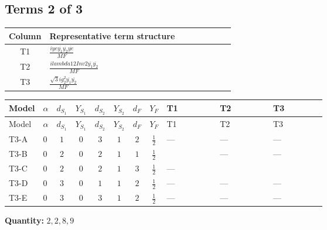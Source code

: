 \documentclass[8pt]{article}
\begin{document}
\begin{landscape}
\subsection*{Terms 2 of 3}
\begin{center}
\begin{tabular}{@{}c >{\raggedright\arraybackslash}p{0.82\linewidth}@{}}
\toprule
Column & Representative term structure \\
\midrule
T1 & \(\displaystyle \frac{i ye \overline{y_{1}} \overline{y_{2}} \overline{ye}}{MF}\) \\
\midrule
T2 & \(\displaystyle \frac{i lambda12Inv2 \overline{y_{1}} \overline{y_{2}}}{MF}\) \\
\midrule
T3 & \(\displaystyle \frac{\sqrt{3} i g_{2}^{2} \overline{y_{1}} \overline{y_{2}}}{MF}\) \\
\midrule
\bottomrule
\end{tabular}
\end{center}
\smallskip
\tiny
\begin{longtable}{@{}llcccccc >{\raggedright\arraybackslash}p{0.21\linewidth} >{\raggedright\arraybackslash}p{0.21\linewidth} >{\raggedright\arraybackslash}p{0.21\linewidth}@{}}
\toprule
Model & $\alpha$ & $d_{S_1}$ & $Y_{S_1}$ & $d_{S_2}$ & $Y_{S_2}$ & $d_F$ & $Y_F$ & T1 & T2 & T3 \\
\midrule
\endfirsthead
\toprule
Model & $\alpha$ & $d_{S_1}$ & $Y_{S_1}$ & $d_{S_2}$ & $Y_{S_2}$ & $d_F$ & $Y_F$ & T1 & T2 & T3 \\
\midrule
\endhead
T3-A & $0$ & $1$ & $0$ & $3$ & $1$ & $2$ & $\frac{1}{2}$ & --- & --- & --- \\
\midrule
T3-B & $0$ & $2$ & $0$ & $2$ & $1$ & $1$ & $\frac{1}{2}$ & \scriptsize\adjustbox{max width=\linewidth}{$\begin{gathered} \frac{i ye \overline{y_{1}} \overline{y_{2}} \overline{ye}}{4 MF}\end{gathered}$} & --- & --- \\
\midrule
T3-C & $0$ & $2$ & $0$ & $2$ & $1$ & $3$ & $\frac{1}{2}$ & --- & \scriptsize\adjustbox{max width=\linewidth}{$\begin{gathered} \frac{i lambda12Inv2 \overline{y_{1}} \overline{y_{2}}}{3 MF}\end{gathered}$} & \scriptsize\adjustbox{max width=\linewidth}{$\begin{gathered} \frac{\sqrt{3} i g_{2}^{2} \overline{y_{1}} \overline{y_{2}}}{4 MF}\end{gathered}$} \\
\midrule
T3-D & $0$ & $3$ & $0$ & $1$ & $1$ & $2$ & $\frac{1}{2}$ & --- & --- & --- \\
\midrule
T3-E & $0$ & $3$ & $0$ & $3$ & $1$ & $2$ & $\frac{1}{2}$ & --- & --- & --- \\
\midrule
\bottomrule
\end{longtable}
\clearpage
\noindent\textbf{Quantity: }$\mathrm{2,2,8,9}$\par\smallskip

\end{landscape}
\end{document}
